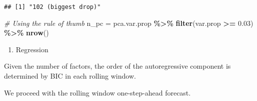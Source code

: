 \documentclass[
]{article}
\newenvironment{Shaded}{\begin{snugshade}}{\end{snugshade}}
\newcommand{\AttributeTok}[1]{\textcolor[rgb]{0.13,0.29,0.53}{#1}}
\newcommand{\CommentTok}[1]{\textcolor[rgb]{0.56,0.35,0.01}{\textit{#1}}}
\newcommand{\DecValTok}[1]{\textcolor[rgb]{0.00,0.00,0.81}{#1}}
\newcommand{\FloatTok}[1]{\textcolor[rgb]{0.00,0.00,0.81}{#1}}
\newcommand{\FunctionTok}[1]{\textcolor[rgb]{0.13,0.29,0.53}{\textbf{#1}}}
\newcommand{\NormalTok}[1]{#1}
\newcommand{\OtherTok}[1]{\textcolor[rgb]{0.56,0.35,0.01}{#1}}
\newcommand{\SpecialCharTok}[1]{\textcolor[rgb]{0.81,0.36,0.00}{\textbf{#1}}}
\newcommand{\StringTok}[1]{\textcolor[rgb]{0.31,0.60,0.02}{#1}}
\providecommand{\tightlist}{%
  \setlength{\itemsep}{0pt}\setlength{\parskip}{0pt}}
\begin{document}
\begin{verbatim}
## [1] "102 (biggest drop)"
\end{verbatim}

\begin{Shaded}
\begin{Highlighting}[]
\CommentTok{\# Using the rule of thumb}
\NormalTok{n\_pc }\OtherTok{=}\NormalTok{ pca.var.prop }\SpecialCharTok{\%\textgreater{}\%}
    \FunctionTok{filter}\NormalTok{(var.prop }\SpecialCharTok{\textgreater{}=} \FloatTok{0.03}\NormalTok{) }\SpecialCharTok{\%\textgreater{}\%}
    \FunctionTok{nrow}\NormalTok{()}
\end{Highlighting}
\end{Shaded}

\begin{enumerate}
\def\labelenumi{\arabic{enumi}.}
\setcounter{enumi}{2}
\tightlist
\item
  Regression
\end{enumerate}

Given the number of factors, the order of the autoregressive component
is determined by BIC in each rolling window.

\begin{Shaded}
\end{Shaded}

We proceed with the rolling window one-step-ahead forecast.
\end{document}
